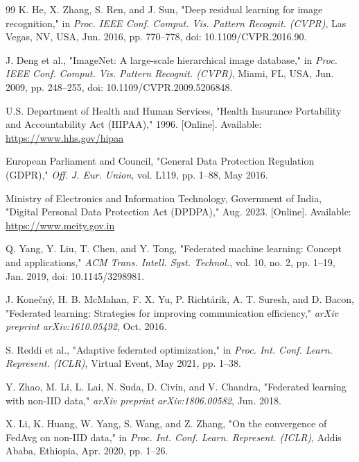 \begin{thebibliography}{99}
 K. He, X. Zhang, S. Ren, and J. Sun, "Deep residual learning for image recognition," in \textit{Proc. IEEE Conf. Comput. Vis. Pattern Recognit. (CVPR)}, Las Vegas, NV, USA, Jun. 2016, pp. 770–778, doi: 10.1109/CVPR.2016.90.

 J. Deng et al., "ImageNet: A large-scale hierarchical image database," in \textit{Proc. IEEE Conf. Comput. Vis. Pattern Recognit. (CVPR)}, Miami, FL, USA, Jun. 2009, pp. 248–255, doi: 10.1109/CVPR.2009.5206848.

 U.S. Department of Health and Human Services, "Health Insurance Portability and Accountability Act (HIPAA)," 1996. [Online]. Available: \url{https://www.hhs.gov/hipaa}

 European Parliament and Council, "General Data Protection Regulation (GDPR)," \textit{Off. J. Eur. Union}, vol. L119, pp. 1–88, May 2016.

 Ministry of Electronics and Information Technology, Government of India, "Digital Personal Data Protection Act (DPDPA)," Aug. 2023. [Online]. Available: \url{https://www.meity.gov.in}

 Q. Yang, Y. Liu, T. Chen, and Y. Tong, "Federated machine learning: Concept and applications," \textit{ACM Trans. Intell. Syst. Technol.}, vol. 10, no. 2, pp. 1–19, Jan. 2019, doi: 10.1145/3298981.

 J. Konečný, H. B. McMahan, F. X. Yu, P. Richtárik, A. T. Suresh, and D. Bacon, "Federated learning: Strategies for improving communication efficiency," \textit{arXiv preprint arXiv:1610.05492}, Oct. 2016.

 S. Reddi et al., "Adaptive federated optimization," in \textit{Proc. Int. Conf. Learn. Represent. (ICLR)}, Virtual Event, May 2021, pp. 1–38.

 Y. Zhao, M. Li, L. Lai, N. Suda, D. Civin, and V. Chandra, "Federated learning with non-IID data," \textit{arXiv preprint arXiv:1806.00582}, Jun. 2018.

 X. Li, K. Huang, W. Yang, S. Wang, and Z. Zhang, "On the convergence of FedAvg on non-IID data," in \textit{Proc. Int. Conf. Learn. Represent. (ICLR)}, Addis Ababa, Ethiopia, Apr. 2020, pp. 1–26.

\end{thebibliography}

